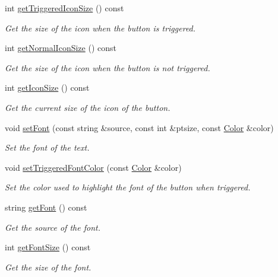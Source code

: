 \begin{DoxyCompactItemize}
int \mbox{\hyperlink{class_button_a317bc7f7c5d871d60515aa91a434f645}{get\+Triggered\+Icon\+Size}} () const
\begin{DoxyCompactList}\small\item\em Get the size of the icon when the button is triggered. \end{DoxyCompactList}\item 
int \mbox{\hyperlink{class_button_a8524ec4a0e9de07413fe445104654a90}{get\+Normal\+Icon\+Size}} () const
\begin{DoxyCompactList}\small\item\em Get the size of the icon when the button is not triggered. \end{DoxyCompactList}\item 
int \mbox{\hyperlink{class_button_a3c2aae2875eb8879dd7d623e3cfd6710}{get\+Icon\+Size}} () const
\begin{DoxyCompactList}\small\item\em Get the current size of the icon of the button. \end{DoxyCompactList}\item 
void \mbox{\hyperlink{class_button_ae899f37b125b8514af8153b694dad678}{set\+Font}} (const string \&source, const int \&ptsize, const \mbox{\hyperlink{class_color}{Color}} \&color)
\begin{DoxyCompactList}\small\item\em Set the font of the text. \end{DoxyCompactList}\item 
void \mbox{\hyperlink{class_button_a2e15e337fa9b03c765974215b24787ba}{set\+Triggered\+Font\+Color}} (const \mbox{\hyperlink{class_color}{Color}} \&color)
\begin{DoxyCompactList}\small\item\em Set the color used to highlight the font of the button when triggered. \end{DoxyCompactList}\item 
string \mbox{\hyperlink{class_button_a51d629e519d30f27ee113efc1a819cab}{get\+Font}} () const
\begin{DoxyCompactList}\small\item\em Get the source of the font. \end{DoxyCompactList}\item 
int \mbox{\hyperlink{class_button_a29dcfb418006f9dee46e654b1124e950}{get\+Font\+Size}} () const
\begin{DoxyCompactList}\small\item\em Get the size of the font. \end{DoxyCompactList}\item 

\end{DoxyCompactItemize}
